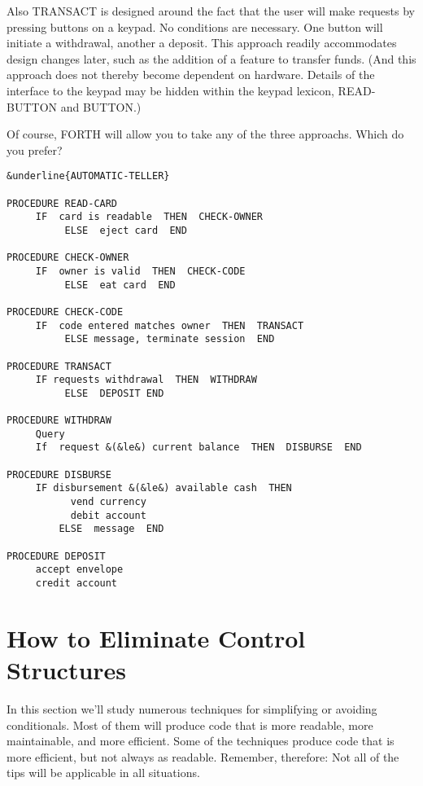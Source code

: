 Also TRANSACT is designed around the fact that the user will
make requests by pressing buttons on a keypad. No conditions are
necessary. One button will initiate a withdrawal, another a deposit. This
approach readily accommodates design changes later, such as the addition
of a feature to transfer funds. (And this approach does not thereby
become dependent on hardware. Details of the interface to the keypad
may be hidden within the keypad lexicon, READ-BUTTON and
BUTTON.)

Of course, FORTH will allow you to take any of the three approachs.
Which do you prefer?

\begin{figure*}[tp]
\small\begin{center}
\begin{BVerbatim}[commandchars=\&\{\}]
&underline{AUTOMATIC-TELLER}

PROCEDURE READ-CARD
     IF  card is readable  THEN  CHECK-OWNER
          ELSE  eject card  END

PROCEDURE CHECK-OWNER
     IF  owner is valid  THEN  CHECK-CODE
          ELSE  eat card  END

PROCEDURE CHECK-CODE
     IF  code entered matches owner  THEN  TRANSACT
          ELSE message, terminate session  END

PROCEDURE TRANSACT
     IF requests withdrawal  THEN  WITHDRAW
          ELSE  DEPOSIT END

PROCEDURE WITHDRAW
     Query
     If  request &(&le&) current balance  THEN  DISBURSE  END

PROCEDURE DISBURSE
     IF disbursement &(&le&) available cash  THEN
           vend currency
           debit account
         ELSE  message  END

PROCEDURE DEPOSIT
     accept envelope
     credit account
\end{BVerbatim}
\end{center}
\end{figure*}

\section{How to Eliminate Control Structures}
In this section we'll study numerous techniques for simplifying or
avoiding conditionals. Most of them will produce code that is more
readable, more maintainable, and more efficient. Some of the techniques
produce code that is more efficient, but not always as readable.
Remember, therefore: Not all of the tips will be applicable in all
situations.

